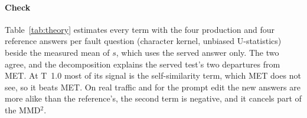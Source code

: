 \documentclass{article}
\begin{document}
\paragraph{Check} Table~\ref{tab:theory} estimates every term with the four
production and four reference answers per fault question (character kernel,
unbiased U-statistics) beside the measured mean of $s$, which uses the served
answer only. The two agree, and the decomposition explains the served test's two
departures from MET. At T~1.0 most of its signal is the self-similarity term,
which MET does not see, so it beats MET. On real traffic and for the prompt edit
the new answers are more alike than the reference's, the second term is negative,
and it cancels part of the MMD$^2$.

\begin{table}[h]
  \centering\small
  \caption{The decomposition, averaged over fault questions ($\times10^{-3}$,
  character kernel). Measured: mean of $s$ from the served answer alone.
  Predicted: $\tfrac12\mathrm{MMD}^2+\tfrac12(K_{rr}-K_{cc})$ from four answers per side.}
  \label{tab:theory}
  \setlength{\tabcolsep}{3.2pt}
\end{table}
\end{document}
